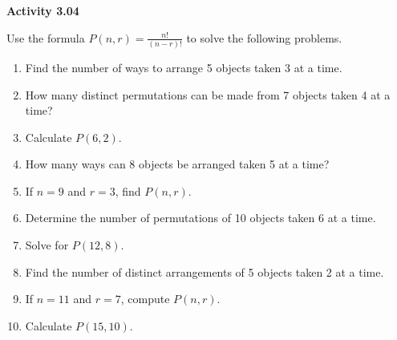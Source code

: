 \vspace{0.3ex}
\noindent\textbf{Activity 3.04}

\vspace{0.2ex}

Use the formula \(P(n, r) = \frac{n!}{(n-r)!}\) to solve the following problems.

\begin{enumerate}[label=\color{blue}\arabic*.]
    \item Find the number of ways to arrange 5 objects taken 3 at a time.
    \item How many distinct permutations can be made from 7 objects taken 4 at a time?
    \item Calculate \(P(6, 2)\).
    \item How many ways can 8 objects be arranged taken 5 at a time?
    \item If \(n = 9\) and \(r = 3\), find \(P(n, r)\).
    \item Determine the number of permutations of 10 objects taken 6 at a time.
    \item Solve for \(P(12, 8)\).
    \item Find the number of distinct arrangements of 5 objects taken 2 at a time.
    \item If \(n = 11\) and \(r = 7\), compute \(P(n, r)\).
    \item Calculate \(P(15, 10)\).
\end{enumerate}
